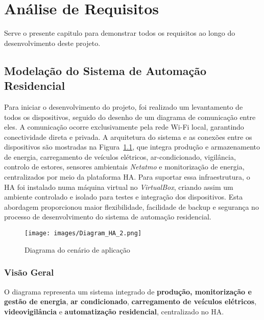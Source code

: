 \chapter{Análise de Requisitos}\label{cap:metodology}

Serve o presente capitulo para demonstrar todos os requisitos ao longo do desenvolvimento deste projeto.


\section{Modelação do Sistema de Automação Residencial}

Para iniciar o desenvolvimento do projeto, foi realizado um levantamento de todos os dispositivos, seguido do desenho de um diagrama de comunicação entre eles. A comunicação ocorre exclusivamente pela rede Wi-Fi local, garantindo conectividade direta e privada. A arquitetura do sistema e as conexões entre os dispositivos são mostradas na Figura~\ref{fig:Diagram_HA_2.png}, que integra produção e armazenamento de energia, carregamento de veículos elétricos, ar-condicionado, vigilância, controlo de estores, sensores ambientais \textit{Netatmo} e monitorização de energia, centralizados por meio da plataforma \gls{HA}. Para suportar essa infraestrutura, o \gls{HA} foi instalado numa máquina virtual no \textit{VirtualBox}, criando assim um ambiente controlado e isolado para testes e integração dos dispositivos. Esta abordagem proporcionou maior flexibilidade, facilidade de backup e segurança no processo de desenvolvimento do sistema de automação residencial.



\begin{figure}[H]
    \centering
    \texttt{[image: images/Diagram\_HA\_2.png]}
    \caption{Diagrama do cenário de aplicação}
    \label{fig:Diagram_HA_2.png}
\end{figure}


\subsection{Visão Geral}

O diagrama representa um sistema integrado de \textbf{produção, monitorização e gestão de energia}, \textbf{ar condicionado}, \textbf{carregamento de veículos elétricos}, \textbf{videovigilância} e \textbf{automatização residencial}, centralizado no \gls{HA}.

\vspace{1em}
